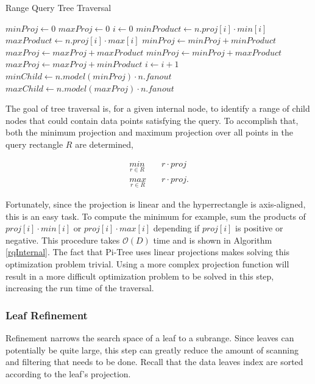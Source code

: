 \documentclass[sigconf,10pt]{acmart}
\begin{document}
\begin{algorithm}
  \caption{Range Query Tree Traversal}
  \label{rqInternal}
    \begin{algorithmic}[1]
    \State {}
    \State \Return{}
    \EndIf
    \State $minProj\gets 0$
    \State $maxProj\gets 0$
    \State $i\gets 0$
    \State $minProduct\gets n.proj[i] \cdot min[i]$
    \State $maxProduct\gets n.proj[i] \cdot max[i]$
    \State $minProj\gets minProj + minProduct$
    \State $maxProj\gets maxProj + maxProduct$
    \Else
    \State $minProj\gets minProj + maxProduct$
    \State $maxProj\gets maxProj + minProduct$
    \EndIf
    \State $i\gets i+1$
    \EndWhile
    \State $minChild \gets n.model(minProj) \cdot n.fanout$
    \State $maxChild \gets n.model(maxProj) \cdot n.fanout$
    \State {}
    \EndFor
    \EndProcedure
  \end{algorithmic}
\end{algorithm}

The goal of tree traversal is, for a given internal node, to identify a range of child nodes
that could contain data points satisfying the query. To accomplish that,
both the minimum projection and maximum projection
over all points in the query rectangle $R$ are determined,

\begin{align*} 
  \underset{r \in R}{min} \quad & r \cdot proj \\
  \underset{r \in R}{max} \quad & r \cdot proj.
\end{align*}

Fortunately, since the projection is linear and the hyperrectangle
is axis-aligned, this is an easy task. To compute the minimum for example,
sum the products of $proj[i] \cdot min[i]$ or $proj[i] \cdot max[i]$ depending
if $proj[i]$ is positive or negative. This procedure takes $\mathcal{O}(D)$ time
and is shown in Algorithm \ref{rqInternal}. The fact that Pi-Tree uses linear projections
makes solving this optimization problem trivial. Using a more
complex projection function will result in a more
difficult optimization problem to be solved in this step, increasing
the run time of the traversal.

\subsubsection{Leaf Refinement}
Refinement narrows the search space of a leaf to a subrange. Since leaves can
potentially be quite large, this step can greatly reduce the amount of 
scanning and filtering that needs to be done. Recall
that the data leaves index are sorted according to the leaf's projection.
\end{document}
